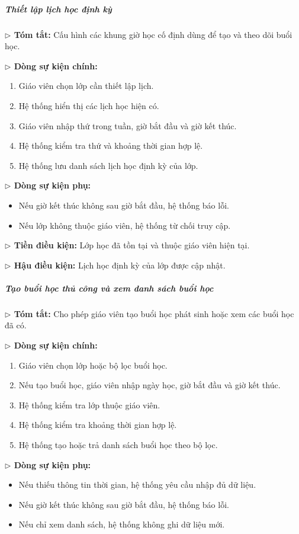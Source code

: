\documentclass[12pt,a4paper]{article}
\newcommand{\code}[1]{{\ttfamily\seqsplit{#1}}}
\begin{document}
\subparagraph{Thiết lập lịch học định kỳ}
\textbf{$\triangleright$ Tóm tắt:} Cấu hình các khung giờ học cố định dùng để tạo và theo dõi buổi học.

\textbf{$\triangleright$ Dòng sự kiện chính:}
\begin{enumerate}[leftmargin=*]
\item Giáo viên chọn lớp cần thiết lập lịch.
\item Hệ thống hiển thị các lịch học hiện có.
\item Giáo viên nhập thứ trong tuần, giờ bắt đầu và giờ kết thúc.
\item Hệ thống kiểm tra thứ và khoảng thời gian hợp lệ.
\item Hệ thống lưu danh sách lịch học định kỳ của lớp.
\end{enumerate}

\textbf{$\triangleright$ Dòng sự kiện phụ:}
\begin{itemize}[leftmargin=*]
\item Nếu giờ kết thúc không sau giờ bắt đầu, hệ thống báo lỗi.
\item Nếu lớp không thuộc giáo viên, hệ thống từ chối truy cập.
\end{itemize}

\textbf{$\triangleright$ Tiền điều kiện:} Lớp học đã tồn tại và thuộc giáo viên hiện tại.

\textbf{$\triangleright$ Hậu điều kiện:} Lịch học định kỳ của lớp được cập nhật.

\subparagraph{Tạo buổi học thủ công và xem danh sách buổi học}
\textbf{$\triangleright$ Tóm tắt:} Cho phép giáo viên tạo buổi học phát sinh hoặc xem các buổi học đã có.

\textbf{$\triangleright$ Dòng sự kiện chính:}
\begin{enumerate}[leftmargin=*]
\item Giáo viên chọn lớp hoặc bộ lọc buổi học.
\item Nếu tạo buổi học, giáo viên nhập ngày học, giờ bắt đầu và giờ kết thúc.
\item Hệ thống kiểm tra lớp thuộc giáo viên.
\item Hệ thống kiểm tra khoảng thời gian hợp lệ.
\item Hệ thống tạo \code{Session} hoặc trả danh sách buổi học theo bộ lọc.
\end{enumerate}

\textbf{$\triangleright$ Dòng sự kiện phụ:}
\begin{itemize}[leftmargin=*]
\item Nếu thiếu thông tin thời gian, hệ thống yêu cầu nhập đủ dữ liệu.
\item Nếu giờ kết thúc không sau giờ bắt đầu, hệ thống báo lỗi.
\item Nếu chỉ xem danh sách, hệ thống không ghi dữ liệu mới.
\end{itemize}
\end{document}
